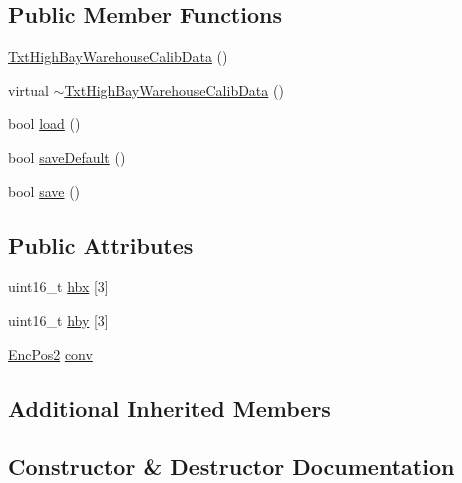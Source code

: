 \subsection*{Public Member Functions}
\begin{DoxyCompactItemize}
\item 
\hyperlink{classft_1_1_txt_high_bay_warehouse_calib_data_ab19ab76a04a49f0e3ce7fa4123a84470}{Txt\+High\+Bay\+Warehouse\+Calib\+Data} ()
\item 
virtual \hyperlink{classft_1_1_txt_high_bay_warehouse_calib_data_a318de726a93b922743284337526d9223}{$\sim$\+Txt\+High\+Bay\+Warehouse\+Calib\+Data} ()
\item 
bool \hyperlink{classft_1_1_txt_high_bay_warehouse_calib_data_a018f042864bebde45e9f138bff550ec9}{load} ()
\item 
bool \hyperlink{classft_1_1_txt_high_bay_warehouse_calib_data_ac8d87668f8d0347714f6545954df3573}{save\+Default} ()
\item 
bool \hyperlink{classft_1_1_txt_high_bay_warehouse_calib_data_a193721ae3de0052eb1a3b74f877363a6}{save} ()
\end{DoxyCompactItemize}
\subsection*{Public Attributes}
\begin{DoxyCompactItemize}
\item 
uint16\+\_\+t \hyperlink{classft_1_1_txt_high_bay_warehouse_calib_data_a90910cc5144915878a613a9a248ea66f}{hbx} \mbox{[}3\mbox{]}
\item 
uint16\+\_\+t \hyperlink{classft_1_1_txt_high_bay_warehouse_calib_data_a6f12021cef4ed3d547cfade44616c15f}{hby} \mbox{[}3\mbox{]}
\item 
\hyperlink{classft_1_1_enc_pos2}{Enc\+Pos2} \hyperlink{classft_1_1_txt_high_bay_warehouse_calib_data_a978a3f44d70956000e110a66b17cf36e}{conv}
\end{DoxyCompactItemize}
\subsection*{Additional Inherited Members}


\subsection{Constructor \& Destructor Documentation}
